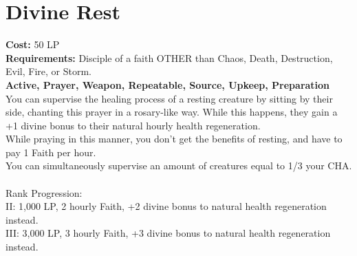 \section{Divine Rest}\label{prayer:divineRest}
\textbf{Cost:} 50 LP\\
\textbf{Requirements:} Disciple of a faith OTHER than Chaos, Death, Destruction, Evil, Fire, or Storm.\\
\textbf{Active, Prayer, Weapon, Repeatable, Source, Upkeep, Preparation}\\
You can supervise the healing process of a resting creature by sitting by their side, chanting this prayer in a rosary-like way.
While this happens, they gain a +1 divine bonus to their natural hourly health regeneration.\\
While praying in this manner, you don't get the benefits of resting, and have to pay 1 Faith per hour.\\
You can simultaneously supervise an amount of creatures equal to 1/3 your CHA.\\
\\
Rank Progression:\\
II: 1,000 LP, 2 hourly Faith, +2 divine bonus to natural health regeneration instead.\\
III: 3,000 LP, 3 hourly Faith, +3 divine bonus to natural health regeneration instead.\\